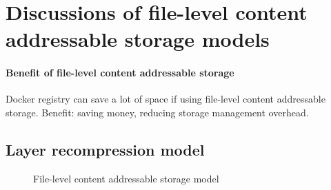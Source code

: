 \section{Discussions of file-level content addressable storage models}
\label{sec:file_adressable}

\paragraph{Benefit of file-level content addressable storage}
Docker registry can save a lot of space if using file-level content addressable storage. 
Benefit: saving money, reducing storage management overhead.

\subsection{Layer recompression model}

\begin{figure}
	\centering
	\caption{File-level content addressable storage model}
	\label{fig:eval-stdev-erasure-cnt}
\end{figure}


